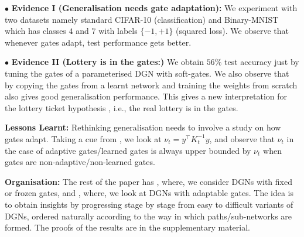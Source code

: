 $\bullet$ \textbf{Evidence I (Generalisation needs gate adaptation):}  We experiment with two datasets namely standard CIFAR-10 (classification) and Binary-MNIST which has classes $4$ and $7$ with labels $\{-1,+1\}$ (squared loss). We observe that whenever gates adapt, test performance gets better.

$\bullet$ \textbf{Evidence II (Lottery is in the gates:)} We obtain $56\%$ test accuracy just by tuning the gates of a parameterised DGN with soft-gates. We also observe that by copying the gates from a learnt network and training the weights from scratch also gives good generalisation performance. This gives a new interpretation for the lottery ticket hypothesis \cite{lottery}, i.e., the real lottery is in the gates.

\textbf{Lessons Learnt:} Rethinking generalisation needs to involve a study on how gates adapt. Taking a cue from \cite{arora}, we look at $\nu_t=y^\top K_t^{-1}y$, and observe that $\nu_t$ in the case of adaptive gates/learned gates is always upper bounded by $\nu_t$ when gates are non-adaptive/non-learned gates.

\textbf{Organisation:} The rest of the paper has , where, we consider DGNs with fixed or frozen gates, and , where, we look at DGNs with adaptable gates. The idea is to obtain insights by progressing stage by stage from easy to difficult variants of DGNs, ordered naturally according to the way in which paths/sub-networks are formed. The proofs of the results are in the supplementary material.

